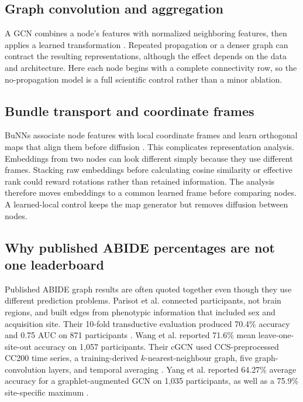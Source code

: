 \documentclass[11pt,a4paper]{article}
\begin{document}
\subsection{Graph convolution and aggregation}

A GCN combines a node's features with normalized neighboring features, then
applies a learned transformation \cite{kipf2017gcn}. Repeated propagation or a
denser graph can contract the resulting representations, although the effect
depends on the data and architecture. Here each node begins with a complete
connectivity row, so the no-propagation model is a full scientific control
rather than a minor ablation.

\subsection{Bundle transport and coordinate frames}

BuNNs associate node features with local coordinate frames and learn
orthogonal maps that align them before diffusion \cite{bamberger2025bundle}.
This complicates representation analysis. Embeddings from two nodes can look
different simply because they use different frames. Stacking raw embeddings
before calculating cosine similarity or effective rank could reward rotations
rather than retained information. The analysis therefore moves embeddings to
a common learned frame before comparing nodes. A learned-local control keeps
the map generator but removes diffusion between nodes.

\subsection{Why published ABIDE percentages are not one leaderboard}

Published ABIDE graph results are often quoted together even though they use
different prediction problems. Parisot et al. connected participants, not
brain regions, and built edges from phenotypic information that included sex
and acquisition site. Their 10-fold transductive evaluation produced 70.4\%
accuracy and 0.75 AUC on 871 participants \cite{parisot2018disease}. Wang et
al. reported 71.6\% mean leave-one-site-out accuracy on 1,057 participants.
Their cGCN used CCS-preprocessed CC200 time series, a training-derived
$k$-nearest-neighbour graph, five graph-convolution layers, and temporal
averaging \cite{wang2021cgcn}. Yang et al. reported 64.27\% average accuracy
for a graphlet-augmented GCN on 1,035 participants, as well as a 75.9\%
site-specific maximum \cite{yang2022graphletgcn}.
\end{document}
